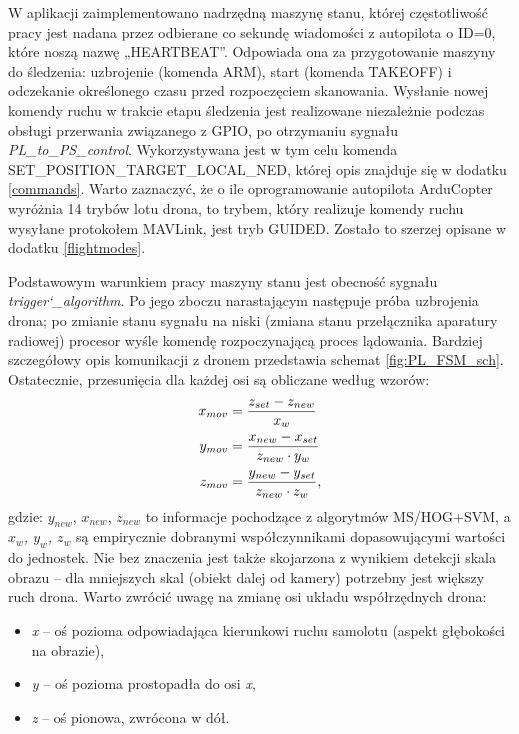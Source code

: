 W aplikacji zaimplementowano nadrzędną maszynę stanu, której częstotliwość pracy jest nadana przez odbierane co sekundę wiadomości z autopilota o ID=0, które noszą nazwę „HEARTBEAT”. %
Odpowiada ona za przygotowanie maszyny do śledzenia: uzbrojenie (komenda ARM), start (komenda TAKEOFF) i odczekanie określonego czasu przed rozpoczęciem skanowania. Wysłanie nowej komendy ruchu w trakcie etapu śledzenia jest realizowane niezależnie  podczas obsługi przerwania związanego z GPIO, po otrzymaniu sygnału \textit{PL\_to\_PS\_control}. Wykorzystywana jest w tym celu komenda SET\_POSITION\_TARGET\_LOCAL\_NED, której opis znajduje się w dodatku \ref{commands}. Warto zaznaczyć, że o ile oprogramowanie autopilota ArduCopter wyróżnia 14 trybów lotu drona, to trybem, który realizuje komendy ruchu wysyłane protokołem MAVLink, jest tryb GUIDED. Zostało to szerzej opisane w dodatku \ref{flightmodes}.

Podstawowym warunkiem pracy maszyny stanu jest obecność sygnału \textit{trigger\char`_algorithm}. 
Po jego zboczu narastającym następuje próba uzbrojenia drona; po zmianie stanu sygnału na niski (zmiana stanu przełącznika aparatury radiowej) procesor wyśle komendę rozpoczynającą proces lądowania. %
Bardziej szczegółowy opis komunikacji z dronem przedstawia schemat \ref{fig:PL_FSM_sch}.
Ostatecznie, przesunięcia dla każdej osi są obliczane według wzorów:
\begin{equation}
\left.\begin{aligned}
x_{mov}&= \frac{\boldmath{z_{set}}-z_{new}}{x_w}\\
y_{mov}&= \frac{x_{new}-\boldmath{x_{set}}}{z_{new}\cdot y_w}\\
z_{mov}&= \frac{y_{new}-\boldmath{y_{set}}}{z_{new}\cdot z_w},\\
\end{aligned}\right.
\end{equation}
gdzie: $y_{new}$, $x_{new}$, $z_{new}$ to informacje pochodzące z algorytmów MS/HOG+SVM, a \textit{$x_w$, $y_w$, $z_w$} są empirycznie dobranymi współczynnikami dopasowującymi wartości do jednostek. Nie bez znaczenia jest także skojarzona z wynikiem detekcji skala obrazu -- dla mniejszych skal (obiekt dalej od kamery) potrzebny jest większy ruch drona. Warto zwrócić uwagę na zmianę osi układu współrzędnych drona:
\begin{itemize}
	\item \textit{x} -- oś pozioma odpowiadająca kierunkowi ruchu samolotu (aspekt głębokości na obrazie),
	\item \textit{y} -- oś pozioma prostopadła do osi \textit{x},
	\item \textit{z} -- oś pionowa, zwrócona w dół.
\end{itemize}

